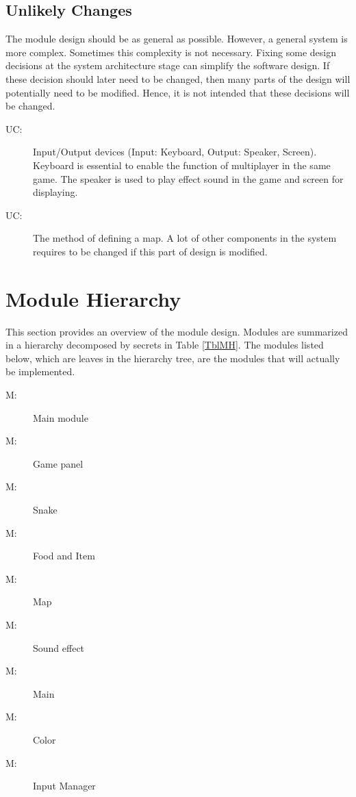 \documentclass[12pt, titlepage]{article}
\newcounter{ucnum}
\newcommand{\uctheucnum}{UC\theucnum}
\newcounter{mnum}
\newcommand{\mthemnum}{M\themnum}
\begin{document}
\subsection{Unlikely Changes} \label{SecUchange}

The module design should be as general as possible. However, a general system is
more complex. Sometimes this complexity is not necessary. Fixing some design
decisions at the system architecture stage can simplify the software design. If
these decision should later need to be changed, then many parts of the design
will potentially need to be modified. Hence, it is not intended that these
decisions will be changed.

\begin{description}
\item[ \uctheucnum \label{ucIO}:] Input/Output devices
  (Input: Keyboard, Output: Speaker, Screen). Keyboard is essential to enable the function of 
  multiplayer in the same game. The speaker is used to play effect sound in the game and screen 
  for displaying.
\item[ \uctheucnum \label{ucMap}:] The method of defining a map. A lot of 
other components in the system requires to be changed if this part of design is modified.
\end{description}

\section{Module Hierarchy} \label{SecMH}

This section provides an overview of the module design. Modules are summarized
in a hierarchy decomposed by secrets in Table \ref{TblMH}. The modules listed
below, which are leaves in the hierarchy tree, are the modules that will
actually be implemented.

\begin{description}
\item [ \mthemnum \label{mHardwareHiding}:] Main module
\item [ \mthemnum \label{mGamePanel}:] Game panel
\item [ \mthemnum \label{mSnake}:] Snake
\item [ \mthemnum \label{mFoodItem}:] Food and Item
\item [ \mthemnum \label{mMap}:] Map
\item [ \mthemnum \label{mSoundEffect}:] Sound effect
\item [ \mthemnum \label{mMain}:] Main
\item [ \mthemnum \label{mColor}:] Color
\item [ \mthemnum \label{mInput}:] Input Manager
\end{description}
\end{document}
